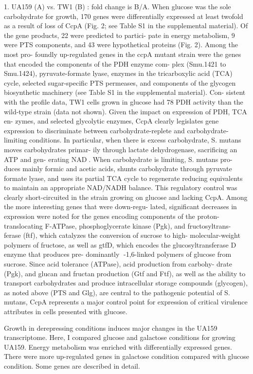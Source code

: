 \documentclass{article}
\begin{document}
1. UA159 (A) vs. TW1 (B) : fold change is B/A.
When glucose was the sole carbohydrate for growth, 170 genes were differentially
expressed at least twofold as a result of loss of CcpA (Fig. 2; see Table S1 in
the supplemental material). Of the gene products, 22 were predicted to partici-
pate in energy metabolism, 9 were PTS components, and 43 were hypothetical
proteins (Fig. 2). Among the most pro- foundly up-regulated genes in the ccpA
mutant strain were the genes that encoded the components of the PDH enzyme com-
plex (Smu.1421 to Smu.1424), pyruvate-formate lyase, enzymes in the
tricarboxylic acid (TCA) cycle, selected sugar-specific PTS permeases, and
components of the glycogen biosynthetic machinery (see Table S1 in the
supplemental material). 
Con- sistent with the profile data, TW1 cells grown in glucose had 78%
PDH activity than the wild-type strain (data not shown). Given the impact on
expression of PDH, TCA en- zymes, and selected glycolytic enzymes, CcpA clearly
legislates gene expression to discriminate between carbohydrate-replete and
carbohydrate-limiting conditions. In particular, when there is excess
carbohydrate, S. mutans moves carbohydrates primar- ily through lactate
dehydrogenase, sacrificing an ATP and gen- erating NAD􏰜. When carbohydrate is
limiting, S. mutans pro- duces mainly formic and acetic acids, shunts
carbohydrate through pyruvate formate lyase, and uses its partial TCA cycle to
regenerate reducing equivalents to maintain an appropriate NAD/NADH balance.
This regulatory control was clearly short-circuited in the strain growing on
glucose and lacking CcpA.
Among the more interesting genes that were down-regu- lated, significant
decreases in expression were noted for the genes encoding components of the
proton-translocating F-ATPase, phosphoglycerate kinase (Pgk), and
fructosyltrans- ferase (ftf), which catalyzes the conversion of sucrose to high-
molecular-weight polymers of fructose, as well as gtfD, which encodes the
glucosyltransferase D enzyme that produces pre- dominantly 􏰐-1,6-linked polymers
of glucose from sucrose. Since acid tolerance (ATPase), acid production from
carbohy- drate (Pgk), and glucan and fructan production (Gtf and Ftf), as well
as the ability to transport carbohydrates and produce intracellular storage
compounds (glycogen), as noted above (PTS and Glg), are central to the
pathogenic potential of S. mutans, CcpA represents a major control point for
expression of critical virulence attributes in cells presented with glucose.


Growth in derepressing conditions induces major changes in the UA159
transcriptome. Here, I compared glucose and galactose conditions for growing
UA159. Energy metabolism was enriched with differentially expressed genes. There
were more up-regulated genes in galactose condition compared with glucose
condition. Some genes are described in detail. 
\end{document}
